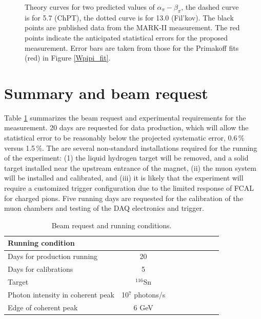 \begin{figure}[tp]
\centering
\caption{Theory curves for two predicted values of $\alpha_{\pi}-\beta_{\pi}$, the dashed
curve is for 5.7 (ChPT), the dotted curve is for 13.0 (Fil'kov). 
The black points are published data from the MARK-II measurement. 
The red points indicate the anticipated statistical errors for the proposed measurement.
Error bars are taken from those for the Primakoff fits (red) in Figure \ref{Wpipi_fit}.}
\label{cpp_theory_fit}
\end{figure}

\clearpage

\section{Summary and beam request}

Table \ref{request} summarizes the beam request and experimental requirements for the measurement.  20 days are requested for
data production, which  will allow the statistical error to be reasonably below the projected systematic
error, 0.6\,\% versus 1.5\,\%.  The are several non-standard installations required for the running of the
experiment: (1) the liquid hydrogen target will be  removed, and a solid target installed near the upstream
entrance of the magnet, (ii) the muon system will be installed and calibrated, and (iii) it is likely that the experiment
will require a customized trigger  configuration due to the limited  response of FCAL for charged pions.  
Five running  days are requested for the calibration of the muon chambers and testing of the DAQ electronics and trigger. 

\begin{table}[bt]
\caption{Beam request and running conditions.
\label{request}
}
\begin{center}
\begin{tabular}{|l|c|c|c|c|c|c|c|c|}
\hline
\hline
  Running condition  &            \\ \hline
  Days for production running  &   20   \\ \hline
  Days for calibrations &  5       \\ \hline
  Target   & $^{116}$Sn   \\ \hline
  Photon intensity in coherent peak &   10$^7$ photons/s     \\ \hline
  Edge of coherent peak  &  6 GeV   \\ \hline
 \hline
 \hline
\end{tabular}
\end{center}
\end{table}

